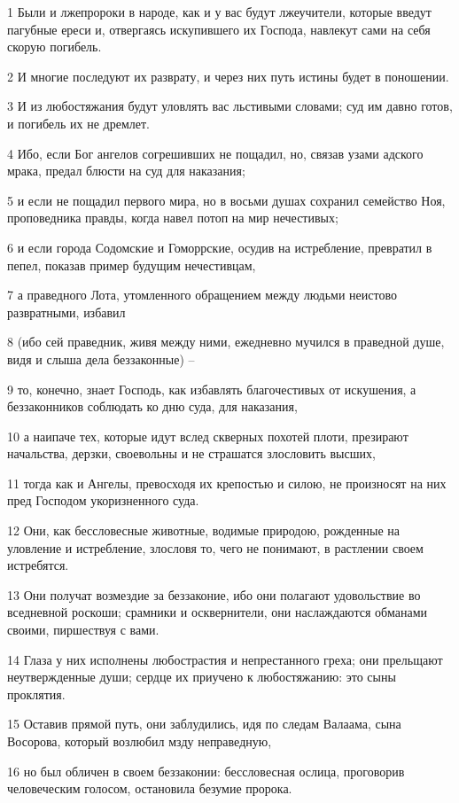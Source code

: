 \par 1 Были и лжепророки в народе, как и у вас будут лжеучители, которые введут пагубные ереси и, отвергаясь искупившего их Господа, навлекут сами на себя скорую погибель.
\par 2 И многие последуют их разврату, и через них путь истины будет в поношении.
\par 3 И из любостяжания будут уловлять вас льстивыми словами; суд им давно готов, и погибель их не дремлет.
\par 4 Ибо, если Бог ангелов согрешивших не пощадил, но, связав узами адского мрака, предал блюсти на суд для наказания;
\par 5 и если не пощадил первого мира, но в восьми душах сохранил семейство Ноя, проповедника правды, когда навел потоп на мир нечестивых;
\par 6 и если города Содомские и Гоморрские, осудив на истребление, превратил в пепел, показав пример будущим нечестивцам,
\par 7 а праведного Лота, утомленного обращением между людьми неистово развратными, избавил
\par 8 (ибо сей праведник, живя между ними, ежедневно мучился в праведной душе, видя и слыша дела беззаконные) --
\par 9 то, конечно, знает Господь, как избавлять благочестивых от искушения, а беззаконников соблюдать ко дню суда, для наказания,
\par 10 а наипаче тех, которые идут вслед скверных похотей плоти, презирают начальства, дерзки, своевольны и не страшатся злословить высших,
\par 11 тогда как и Ангелы, превосходя их крепостью и силою, не произносят на них пред Господом укоризненного суда.
\par 12 Они, как бессловесные животные, водимые природою, рожденные на уловление и истребление, злословя то, чего не понимают, в растлении своем истребятся.
\par 13 Они получат возмездие за беззаконие, ибо они полагают удовольствие во вседневной роскоши; срамники и осквернители, они наслаждаются обманами своими, пиршествуя с вами.
\par 14 Глаза у них исполнены любострастия и непрестанного греха; они прельщают неутвержденные души; сердце их приучено к любостяжанию: это сыны проклятия.
\par 15 Оставив прямой путь, они заблудились, идя по следам Валаама, сына Восорова, который возлюбил мзду неправедную,
\par 16 но был обличен в своем беззаконии: бессловесная ослица, проговорив человеческим голосом, остановила безумие пророка.
